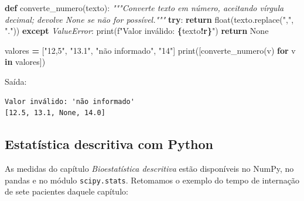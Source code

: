 \documentclass[
]{book}
\newenvironment{Shaded}{\begin{snugshade}}{\end{snugshade}}
\newcommand{\BuiltInTok}[1]{#1}
\newcommand{\CommentTok}[1]{\textcolor[rgb]{0.56,0.35,0.01}{\textit{#1}}}
\newcommand{\ControlFlowTok}[1]{\textcolor[rgb]{0.13,0.29,0.53}{\textbf{#1}}}
\newcommand{\KeywordTok}[1]{\textcolor[rgb]{0.13,0.29,0.53}{\textbf{#1}}}
\newcommand{\NormalTok}[1]{#1}
\newcommand{\OperatorTok}[1]{\textcolor[rgb]{0.81,0.36,0.00}{\textbf{#1}}}
\newcommand{\PreprocessorTok}[1]{\textcolor[rgb]{0.56,0.35,0.01}{\textit{#1}}}
\newcommand{\SpecialCharTok}[1]{\textcolor[rgb]{0.81,0.36,0.00}{\textbf{#1}}}
\newcommand{\SpecialStringTok}[1]{\textcolor[rgb]{0.31,0.60,0.02}{#1}}
\newcommand{\StringTok}[1]{\textcolor[rgb]{0.31,0.60,0.02}{#1}}
\newcommand{\VariableTok}[1]{\textcolor[rgb]{0.00,0.00,0.00}{#1}}
\begin{document}
\begin{Shaded}
\begin{Highlighting}[]
\KeywordTok{def}\NormalTok{ converte\_numero(texto):}
    \CommentTok{"""Converte texto em número, aceitando vírgula decimal; devolve None se não for possível."""}
    \ControlFlowTok{try}\NormalTok{:}
        \ControlFlowTok{return} \BuiltInTok{float}\NormalTok{(texto.replace(}\StringTok{","}\NormalTok{, }\StringTok{"."}\NormalTok{))}
    \ControlFlowTok{except} \PreprocessorTok{ValueError}\NormalTok{:}
        \BuiltInTok{print}\NormalTok{(}\SpecialStringTok{f"Valor inválido: }\SpecialCharTok{\{}\NormalTok{texto}\SpecialCharTok{!r\}}\SpecialStringTok{"}\NormalTok{)}
        \ControlFlowTok{return} \VariableTok{None}

\NormalTok{valores }\OperatorTok{=}\NormalTok{ [}\StringTok{"12,5"}\NormalTok{, }\StringTok{"13.1"}\NormalTok{, }\StringTok{"não informado"}\NormalTok{, }\StringTok{"14"}\NormalTok{]}
\BuiltInTok{print}\NormalTok{([converte\_numero(v) }\ControlFlowTok{for}\NormalTok{ v }\KeywordTok{in}\NormalTok{ valores])}
\end{Highlighting}
\end{Shaded}

Saída:

\begin{verbatim}
Valor inválido: 'não informado'
[12.5, 13.1, None, 14.0]
\end{verbatim}

\subsection{Estatística descritiva com Python}\label{estatuxedstica-descritiva-com-python}

As medidas do capítulo \emph{Bioestatística descritiva} estão disponíveis no NumPy, no pandas e no módulo \texttt{scipy.stats}. Retomamos o exemplo do tempo de internação de sete pacientes daquele capítulo:
\end{document}
